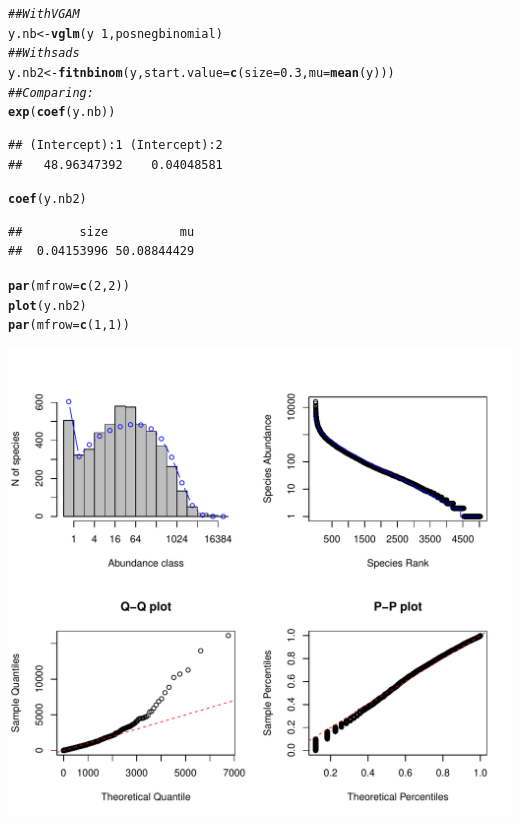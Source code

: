 \documentclass[12pt, A4]{article}\usepackage[]{graphicx}\usepackage[]{color}
\makeatletter
\def\maxwidth{ %
  \ifdim\Gin@nat@width>\linewidth
    \linewidth
  \else
    \Gin@nat@width
  \fi
}
\newcommand{\hlnum}[1]{\textcolor[rgb]{0.686,0.059,0.569}{#1}}%
\newcommand{\hlcom}[1]{\textcolor[rgb]{0.678,0.584,0.686}{\textit{#1}}}%
\newcommand{\hlopt}[1]{\textcolor[rgb]{0,0,0}{#1}}%
\newcommand{\hlstd}[1]{\textcolor[rgb]{0.345,0.345,0.345}{#1}}%
\newcommand{\hlkwb}[1]{\textcolor[rgb]{0.69,0.353,0.396}{#1}}%
\newcommand{\hlkwc}[1]{\textcolor[rgb]{0.333,0.667,0.333}{#1}}%
\newcommand{\hlkwd}[1]{\textcolor[rgb]{0.737,0.353,0.396}{\textbf{#1}}}%
\newenvironment{kframe}{%
 \def\at@end@of@kframe{}%
 \ifinner\ifhmode%
  \def\at@end@of@kframe{\end{minipage}}%
  \begin{minipage}{\columnwidth}%
 \fi\fi%
 \def\FrameCommand##1{\hskip\@totalleftmargin \hskip-\fboxsep
 \colorbox{shadecolor}{##1}\hskip-\fboxsep
     \hskip-\linewidth \hskip-\@totalleftmargin \hskip\columnwidth}%
 \MakeFramed {\advance\hsize-\width
   \@totalleftmargin\z@ \linewidth\hsize
   \@setminipage}}%
 {\par\unskip\endMakeFramed%
 \at@end@of@kframe}
\newenvironment{knitrout}{}{} %
\makeatother
\begin{document}
 
\begin{knitrout}
\color{fgcolor}\begin{kframe}
\begin{alltt}
\hlcom{## With VGAM}
\hlstd{y.nb} \hlkwb{<-} \hlkwd{vglm}\hlstd{(y} \hlopt{~} \hlnum{1}\hlstd{, posnegbinomial)}
\hlcom{## With sads}
\hlstd{y.nb2} \hlkwb{<-} \hlkwd{fitnbinom}\hlstd{(y,} \hlkwc{start.value}\hlstd{=}\hlkwd{c}\hlstd{(}\hlkwc{size}\hlstd{=}\hlnum{0.3}\hlstd{,} \hlkwc{mu}\hlstd{=}\hlkwd{mean}\hlstd{(y)))}
\hlcom{## Comparing: }
\hlkwd{exp}\hlstd{(}\hlkwd{coef}\hlstd{(y.nb))}
\end{alltt}
\begin{verbatim}
## (Intercept):1 (Intercept):2 
##   48.96347392    0.04048581
\end{verbatim}
\begin{alltt}
\hlkwd{coef}\hlstd{(y.nb2)}
\end{alltt}
\begin{verbatim}
##        size          mu 
##  0.04153996 50.08844429
\end{verbatim}
\end{kframe}
\end{knitrout}

\begin{knitrout}
\color{fgcolor}\begin{kframe}
\begin{alltt}
\hlkwd{par}\hlstd{(}\hlkwc{mfrow}\hlstd{=}\hlkwd{c}\hlstd{(}\hlnum{2}\hlstd{,}\hlnum{2}\hlstd{))}
\hlkwd{plot}\hlstd{(y.nb2)}
\hlkwd{par}\hlstd{(}\hlkwc{mfrow}\hlstd{=}\hlkwd{c}\hlstd{(}\hlnum{1}\hlstd{,}\hlnum{1}\hlstd{))}
\end{alltt}
\end{kframe}

{\centering \includegraphics[width=\maxwidth]{figure/nb_plots-1} 

}



\end{knitrout}
\end{document}
